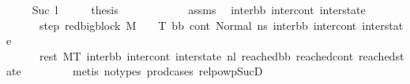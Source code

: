 \begin{isabellebody}
\isamarkupfalse%
\isanewline
\ \ \isamarkupfalse%
\ {}{\isacharcolon}{\kern0pt}\ {\isacharparenleft}{\kern0pt}Suc\ l{}{\isacharparenright}{\kern0pt}\isanewline
\ \ \isamarkupfalse%
\ \isamarkupfalse%
\ {\isacharquery}{\kern0pt}thesis\ \isanewline
\ \ \isamarkupfalse%
\ {\isacharminus}{\kern0pt}\isanewline
\ \ \ \ \isamarkupfalse%
\ {}\ assms\ \isamarkupfalse%
\ inter{\isacharunderscore}{\kern0pt}bb\ inter{\isacharunderscore}{\kern0pt}cont\ inter{\isacharunderscore}{\kern0pt}state\ \isanewline
\ \ \ \ \ \ step{}{\isacharcolon}{\kern0pt}\ {\isachardoublequoteopen}{\isacharparenleft}{\kern0pt}red{\isacharunderscore}{\kern0pt}bigblock\ M\ {\isasymLambda}\ {\isasymGamma}\ {\isasymOmega}\ T\ {\isacharparenleft}{\kern0pt}bb{}{\isacharcomma}{\kern0pt}\ cont{}{\isacharcomma}{\kern0pt}\ Normal\ ns{\isacharparenright}{\kern0pt}\ {\isacharparenleft}{\kern0pt}inter{\isacharunderscore}{\kern0pt}bb{\isacharcomma}{\kern0pt}\ inter{\isacharunderscore}{\kern0pt}cont{\isacharcomma}{\kern0pt}\ inter{\isacharunderscore}{\kern0pt}state{\isacharparenright}{\kern0pt}{\isacharparenright}{\kern0pt}{\isachardoublequoteclose}\ \ \isanewline
\ \ \ \ \ \ rest{\isacharcolon}{\kern0pt}\ {\isachardoublequoteopen}M{\isacharcomma}{\kern0pt}{\isasymLambda}{\isacharcomma}{\kern0pt}{\isasymGamma}{\isacharcomma}{\kern0pt}{\isasymOmega}{\isacharcomma}{\kern0pt}T\ {\isasymturnstile}{\isacharparenleft}{\kern0pt}inter{\isacharunderscore}{\kern0pt}bb{\isacharcomma}{\kern0pt}\ inter{\isacharunderscore}{\kern0pt}cont{\isacharcomma}{\kern0pt}\ inter{\isacharunderscore}{\kern0pt}state{\isacharparenright}{\kern0pt}\ {\isacharminus}{\kern0pt}n{\isasymlongrightarrow}{\isacharcircum}{\kern0pt}l{}\ {\isacharparenleft}{\kern0pt}reached{\isacharunderscore}{\kern0pt}bb{\isacharcomma}{\kern0pt}\ reached{\isacharunderscore}{\kern0pt}cont{\isacharcomma}{\kern0pt}\ reached{\isacharunderscore}{\kern0pt}state{\isacharparenright}{\kern0pt}{\isachardoublequoteclose}\ \isanewline
\ \ \ \ \ \ \isamarkupfalse%
\ {\isacharparenleft}{\kern0pt}metis\ {\isacharparenleft}{\kern0pt}no{\isacharunderscore}{\kern0pt}types{\isacharparenright}{\kern0pt}\ prod{\isacharunderscore}{\kern0pt}cases{}\ relpowp{\isacharunderscore}{\kern0pt}Suc{\isacharunderscore}{\kern0pt}D{}{\isacharparenright}{\kern0pt}\isanewline
\ \ \ \ \isamarkupfalse%

\end{isabellebody}
